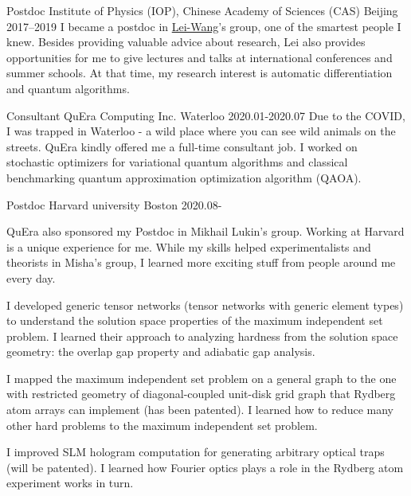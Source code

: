 \documentclass[11pt, a4paper]{awesome-cv}
\begin{document}
\begin{cvskills}
\end{cvskills}
\begin{cventries}
  \cventry
    {Postdoc}
    {Institute of Physics (IOP), Chinese Academy of Sciences (CAS)}
    {Beijing}
    {2017--2019}
    {
      I became a postdoc in \href{http://wangleiphy.github.io/}{Lei-Wang}'s group, one of the smartest people I knew. Besides providing valuable advice about research, Lei also provides opportunities for me to give lectures and talks at international conferences and summer schools. At that time, my research interest is automatic differentiation and quantum algorithms.
    }

  \cventry
    {Consultant}
    {QuEra Computing Inc.}
    {Waterloo}
    {2020.01-2020.07}  %
    {
        Due to the COVID, I was trapped in Waterloo - a wild place where you can see wild animals on the streets. QuEra kindly offered me a full-time consultant job. I worked on stochastic optimizers for variational quantum algorithms and classical benchmarking quantum approximation optimization algorithm (QAOA).    }

  \cventry
    {Postdoc}
    {Harvard university}
    {Boston}
    {2020.08-}  %
    {
    QuEra also sponsored my Postdoc in Mikhail Lukin's group.
    Working at Harvard is a unique experience for me. While my skills helped experimentalists and theorists in Misha's group, I learned more exciting stuff from people around me every day.
    \vspace{2em}
\begin{cvitems}
\item I developed generic tensor networks (tensor networks with generic element types) to understand the solution space properties of the maximum independent set problem. I learned their approach to analyzing hardness from the solution space geometry: the overlap gap property and adiabatic gap analysis.
\item I mapped the maximum independent set problem on a general graph to the one with restricted geometry of diagonal-coupled unit-disk grid graph that Rydberg atom arrays can implement (has been patented). I learned how to reduce many other hard problems to the maximum independent set problem.
\item I improved SLM hologram computation for generating arbitrary optical traps (will be patented). I learned how Fourier optics plays a role in the Rydberg atom experiment works in turn.
    \end{cvitems}}
\end{cventries}
\end{document}
